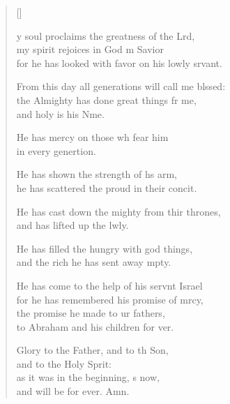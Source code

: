 \settowidth{\versewidth}{From this day all generations will call me blessed: +}
\begin{verse}[\versewidth]
  \begin{patverse}
y soul proclaims the greatness of the Lrd,\Flex\\
my spirit rejoices in God m Savior\Med\\
for he has looked with favor on his lowly srvant.

From this day all generations will call me blssed:\Flex\\
the Almighty has done great things fr me,\Med\\
and holy is his Nme.

He has mercy on those wh fear him\Med\\
in every genertion.

He has shown the strength of h\pointup{\i}s arm,\Med\\
he has scattered the proud in their concit.

He has cast down the mighty from thir thrones,\Med\\
and has lifted up the lwly.

He has filled the hungry with god things,\Med\\
and the rich he has sent away mpty.

He has come to the help of his servnt Israel\Med\\
for he has remembered his promise of mrcy,\\
the promise he made to ur fathers,\Med\\
to Abraham and his children for ver.

Glory to the Father, and to th Son,\Med\\
and to the Holy Sp\pointup{\i}rit:\\
as it was in the beginning, \pointup{\i}s now,\Med\\
and will be for ever. Amn.
  \end{patverse}
\end{verse}

